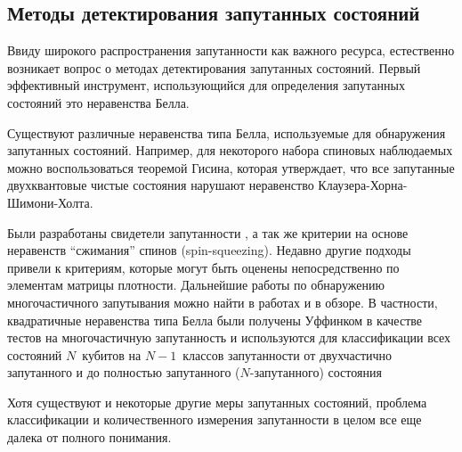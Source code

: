 \subsection{Методы детектирования запутанных состояний}
Ввиду широкого распространения запутанности как важного ресурса,
естественно возникает вопрос о методах детектирования запутанных состояний.
Первый эффективный инструмент,
использующийся для определения запутанных состояний это неравенства Белла\cite{Bell1964}.

Существуют различные неравенства типа Белла, используемые для обнаружения запутанных состояний\cite{Collins2002, Seevinck2001, Toth2005, Nagata2002, Yu2003, Laskowski2005, Schmid2008, Bancal2009, Svetlichny1987, Gisin1998}.
Например, для некоторого набора спиновых наблюдаемых можно воспользоваться теоремой Гисина\cite{Gisin1991},
которая утверждает, что
все запутанные двухквантовые чистые состояния нарушают неравенство Клаузера-Хорна-Шимони-Холта\cite{Clauser1969}.

Были разработаны свидетели запутанности \cite{Wootters1998, Bourennane2004, Kaszlikowski2008, Krammer2009, Bancal2011},
%
а так же критерии на основе неравенств ``сжимания'' спинов (spin-squeezing)\cite{Sorensen2001, Durkin2005, Vitagliano2011, Duan2011}.
Недавно другие подходы привели к критериям, которые могут быть оценены непосредственно по элементам матрицы плотности\cite{Guhne2010, Huber2010}.
Дальнейшие работы по обнаружению многочастичного запутывания можно найти в работах\cite{Li2010, Jungnitsch2011, Vicente2011, Huber2011} и в обзоре\cite{Guhne2009}.
В частности, квадратичные неравенства типа Белла были получены Уффинком\cite{Uffink2002} в качестве тестов на многочастичную запутанность
и используются для классификации всех состояний $N$~кубитов на $N-1$~классов запутанности от двухчастично запутанного и до полностью запутанного
 ($N$-запутанного) состояния\cite{Yu2003}

Хотя существуют и некоторые другие меры запутанных состояний\cite{Guhne2009}, проблема классификации и количественного измерения
запутанности в целом все еще далека от полного
понимания.

%


